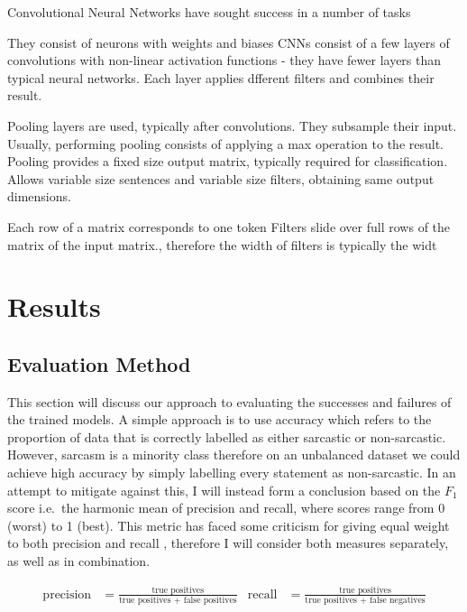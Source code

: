 \documentclass[12pt,a4paper]{article}
\begin{document}
Convolutional Neural Networks have sought success in a number of tasks



They consist of neurons with weights and biases
CNNs consist of a few layers of convolutions with non-linear activation functions - they have fewer layers than typical neural networks. Each layer applies dfferent filters and combines their result.

Pooling layers are used, typically after convolutions. They subsample their input. Usually, performing pooling consists of applying a max operation to the result. Pooling provides a fixed size output matrix, typically required for classification. Allows variable size sentences and variable size filters, obtaining same output dimensions. 

Each row of a matrix corresponds to one token
Filters slide over full rows of the matrix of the input matrix., therefore the width of filters is typically the widt




\section{Results}
\subsection{Evaluation Method}
\noindent This section will discuss our approach to evaluating the successes and failures of the trained models. A simple approach is to use accuracy which refers to the proportion of data that is correctly labelled as either sarcastic or non-sarcastic. However, sarcasm is a minority class therefore on an unbalanced dataset we could achieve high accuracy by simply labelling every statement as non-sarcastic. In an attempt to mitigate against this, I will instead form a conclusion based on the $F_{1}$ score i.e.\ the harmonic mean of precision and recall, where scores range from 0 (worst) to 1 (best). This metric has faced some criticism for giving equal weight to both precision and recall \cite{hand2018note}, therefore I will consider both measures separately, as well as in combination.

\begin{align*}
\mbox{precision} &= \frac{\mbox{true positives}}{\mbox{true positives + false positives}}   &  \mbox{recall} &= \frac{\mbox{true positives}}{\mbox{true positives + false negatives}}
\end{align*}
\end{document}

